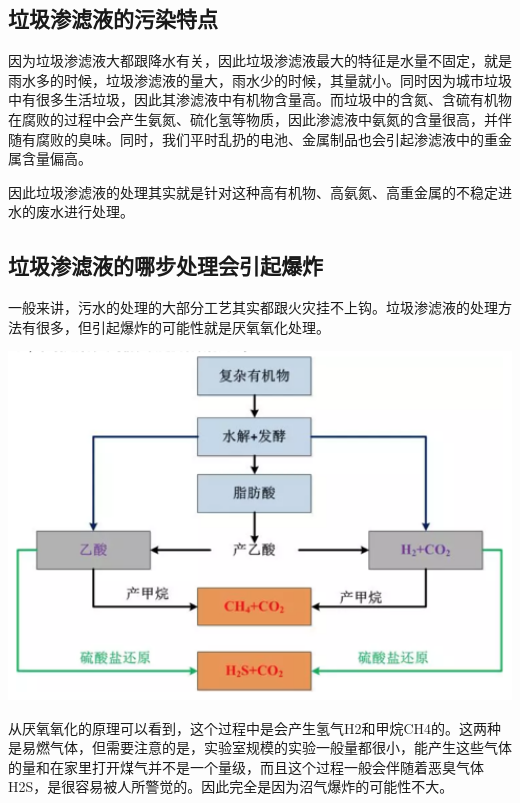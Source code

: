 \documentclass[]{book}
\begin{document}
\hypertarget{ux5783ux573eux6e17ux6ee4ux6db2ux7684ux6c61ux67d3ux7279ux70b9}{%
\subsection{垃圾渗滤液的污染特点}\label{ux5783ux573eux6e17ux6ee4ux6db2ux7684ux6c61ux67d3ux7279ux70b9}}

因为垃圾渗滤液大都跟降水有关，因此垃圾渗滤液最大的特征是水量不固定，就是雨水多的时候，垃圾渗滤液的量大，雨水少的时候，其量就小。同时因为城市垃圾中有很多生活垃圾，因此其渗滤液中有机物含量高。而垃圾中的含氮、含硫有机物在腐败的过程中会产生氨氮、硫化氢等物质，因此渗滤液中氨氮的含量很高，并伴随有腐败的臭味。同时，我们平时乱扔的电池、金属制品也会引起渗滤液中的重金属含量偏高。

因此垃圾渗滤液的处理其实就是针对这种高有机物、高氨氮、高重金属的不稳定进水的废水进行处理。

\hypertarget{ux5783ux573eux6e17ux6ee4ux6db2ux7684ux54eaux6b65ux5904ux7406ux4f1aux5f15ux8d77ux7206ux70b8}{%
\subsection{垃圾渗滤液的哪步处理会引起爆炸}\label{ux5783ux573eux6e17ux6ee4ux6db2ux7684ux54eaux6b65ux5904ux7406ux4f1aux5f15ux8d77ux7206ux70b8}}

一般来讲，污水的处理的大部分工艺其实都跟火灾挂不上钩。垃圾渗滤液的处理方法有很多，但引起爆炸的可能性就是厌氧氧化处理。

\includegraphics[width=6.67in]{images/slybz3}

从厌氧氧化的原理可以看到，这个过程中是会产生氢气H2和甲烷CH4的。这两种是易燃气体，但需要注意的是，实验室规模的实验一般量都很小，能产生这些气体的量和在家里打开煤气并不是一个量级，而且这个过程一般会伴随着恶臭气体H2S，是很容易被人所警觉的。因此完全是因为沼气爆炸的可能性不大。
\end{document}

